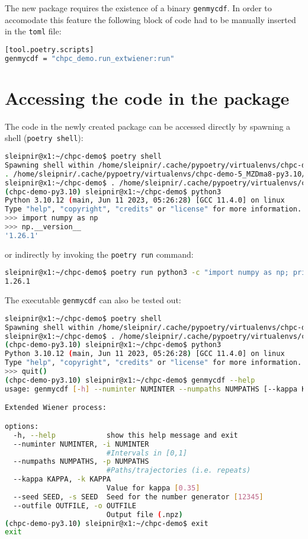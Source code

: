 \documentclass[10pt]{article}
\begin{document}
The new package requires the existence of a binary \texttt{genmycdf}. In order to accomodate this feature the following block of 
code had to be manually inserted in the \texttt{toml} file:
\begin{lstlisting}[language=bash]
[tool.poetry.scripts]
genmycdf = "chpc_demo.run_extwiener:run"
\end{lstlisting}


\section{Accessing the code in the package}
The code in the newly created package can be accessed directly by spawning a shell (\lstinline[language=bash]{poetry shell}):
\begin{lstlisting}[language=bash]
sleipnir@x1:~/chpc-demo$ poetry shell 
Spawning shell within /home/sleipnir/.cache/pypoetry/virtualenvs/chpc-demo-5_MZDma8-py3.10
. /home/sleipnir/.cache/pypoetry/virtualenvs/chpc-demo-5_MZDma8-py3.10/bin/activate
sleipnir@x1:~/chpc-demo$ . /home/sleipnir/.cache/pypoetry/virtualenvs/chpc-demo-5_MZDma8-py3.10/bin/activate
(chpc-demo-py3.10) sleipnir@x1:~/chpc-demo$ python3
Python 3.10.12 (main, Jun 11 2023, 05:26:28) [GCC 11.4.0] on linux
Type "help", "copyright", "credits" or "license" for more information.
>>> import numpy as np
>>> np.__version__
'1.26.1'
\end{lstlisting}
or indirectly by invoking 
the \texttt{poetry run} command:
\begin{lstlisting}[language=bash]
sleipnir@x1:~/chpc-demo$ poetry run python3 -c "import numpy as np; print(np.__version__)"
1.26.1
\end{lstlisting}

The executable \texttt{genmycdf} can also be tested out:
\begin{lstlisting}[language=bash]
sleipnir@x1:~/chpc-demo$ poetry shell
Spawning shell within /home/sleipnir/.cache/pypoetry/virtualenvs/chpc-demo-5_MZDma8-py3.10
sleipnir@x1:~/chpc-demo$ . /home/sleipnir/.cache/pypoetry/virtualenvs/chpc-demo-5_MZDma8-py3.10/bin/activate
(chpc-demo-py3.10) sleipnir@x1:~/chpc-demo$ python3
Python 3.10.12 (main, Jun 11 2023, 05:26:28) [GCC 11.4.0] on linux
Type "help", "copyright", "credits" or "license" for more information.
>>> quit()
(chpc-demo-py3.10) sleipnir@x1:~/chpc-demo$ genmycdf --help
usage: genmycdf [-h] --numinter NUMINTER --numpaths NUMPATHS [--kappa KAPPA] [--seed SEED] --outfile OUTFILE

Extended Wiener process:

options:
  -h, --help            show this help message and exit
  --numinter NUMINTER, -i NUMINTER
                        #Intervals in [0,1]
  --numpaths NUMPATHS, -p NUMPATHS
                        #Paths/trajectories (i.e. repeats)
  --kappa KAPPA, -k KAPPA
                        Value for kappa [0.35]
  --seed SEED, -s SEED  Seed for the number generator [12345]
  --outfile OUTFILE, -o OUTFILE
                        Output file (.npz)
(chpc-demo-py3.10) sleipnir@x1:~/chpc-demo$ exit
exit
\end{lstlisting}
\end{document}
